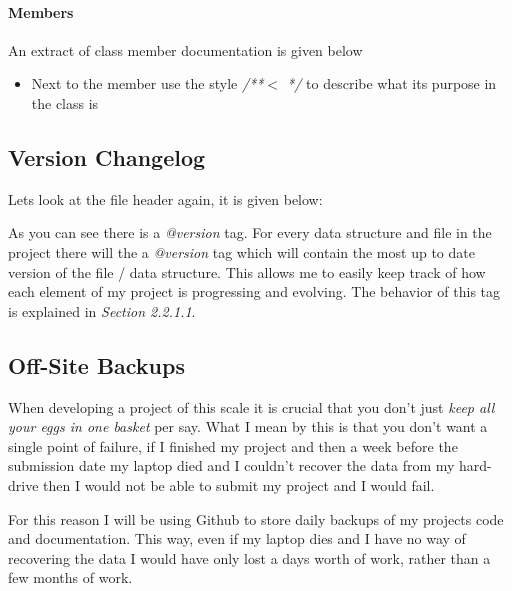 \paragraph{Members}

An extract of class member documentation is given below



\begin{itemize}
\item{Next to the member use the style {\color{green} \textit{/**$<$  */} } to describe what its purpose in the class is}
\end{itemize}

\subsection{Version Changelog}

Lets look at the file header again, it is given below:



As you can see there is a {\color{green} \textit{@version}} tag. For every data structure and file in the project there will the a  {\color{green} \textit{@version}} tag which will contain the most up to date version of the file / data structure. This allows me to easily keep track of how each element of my project is progressing and evolving. The behavior of this tag is explained in \textit{Section 2.2.1.1}. 




\subsection{Off-Site Backups}

When developing a project of this scale it is crucial that you don't just \textit{keep all your eggs in one basket} per say. What I mean by this is that you don't want a single point of failure, if I finished my project and then a week before the submission date my laptop died and I couldn't recover the data from my hard-drive then I would not be able to submit my project and I would fail.

For this reason I will be using Github to store daily backups of my projects code and documentation. This way, even if my laptop dies and I have no way of recovering the data I would have only lost a days worth of work, rather than a few months of work. 

